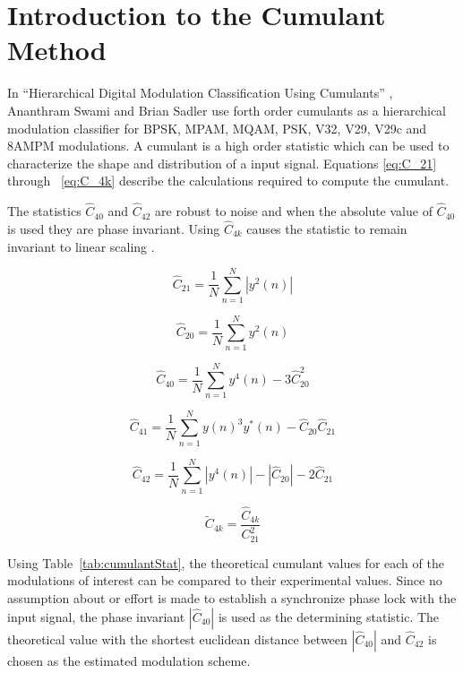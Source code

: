 \section{Introduction to the Cumulant Method}

In ``Hierarchical Digital Modulation Classification Using Cumulants''
\cite{swami2000}, Ananthram Swami and Brian Sadler use forth order cumulants as
a hierarchical modulation classifier for BPSK, MPAM, MQAM, PSK, V32, V29, V29c
and 8AMPM modulations. A cumulant is a high order statistic which can be used to
characterize the shape and distribution of a input signal\cite{swami2000}.
Equations \ref{eq:C_21} through ~\ref{eq:C_4k} describe the calculations
required to compute the cumulant.  

The statistics $\hat{C}_{40}$ and $\hat{C}_{42}$ are robust to noise and when
the absolute value of $\hat{C}_{40}$ is used they are phase invariant.  Using
$\hat{C}_{4k}$ causes the statistic to remain invariant to linear scaling
\cite{swami2000}.

\begin{equation}
\hat{C}_{21} = \frac{1}{N} \sum_{n=1}^{N} |y^2(n)|
\label{eq:C_21}
\end{equation}

\begin{equation}
\hat{C}_{20} = \frac{1}{N} \sum_{n=1}^{N} y^2(n)
\label{eq:C_20} 
\end{equation}

\begin{equation}
\hat{C}_{40} = \frac{1}{N} \sum_{n=1}^{N} y^4(n) - 3 \hat{C}_{20}^2
\label{eq:C_40} 
\end{equation}

\begin{equation}
\hat{C}_{41} = \frac{1}{N} \sum_{n=1}^{N} y(n)^3 y^*(n) - \hat{C}_{20}\hat{C}_{21}
\label{eq:C_41}
\end{equation}

\begin{equation}
\hat{C}_{42} = \frac{1}{N} \sum_{n=1}^{N} |y^4(n)|-|\hat{C}_{20}|-2\hat{C}_{21}
\label{eq:C_42} 
\end{equation}

\begin{equation}
\tilde{C}_{4k} = \frac{\hat{C}_{4k}}{C_{21}^2}
\label{eq:C_4k}  
\end{equation}

Using Table~\ref{tab:cumulantStat}, the theoretical cumulant values for each of
the modulations of interest can be compared to their experimental values.  Since
no assumption about or effort is made to establish a synchronize phase lock with
the input signal, the phase invariant $|\hat{C}_{40}|$ is used as the determining
statistic.  The theoretical value with the shortest euclidean distance between 
$|\hat{C}_{40}|$ and  $\hat{C}_{42}$ is chosen as the estimated modulation
scheme.


